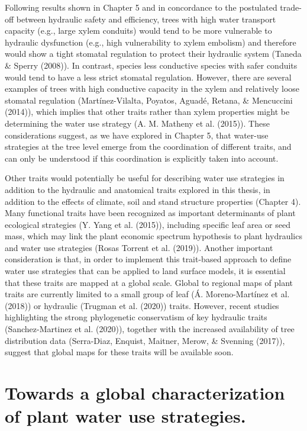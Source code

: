 \documentclass[11pt,twoside]{reedthesis}
\begin{document}
Following results shown in Chapter 5 and in concordance to the
postulated trade-off between hydraulic safety and efficiency, trees with
high water transport capacity (e.g., large xylem conduits) would tend to
be more vulnerable to hydraulic dysfunction (e.g., high vulnerability to
xylem embolism) and therefore would show a tight stomatal regulation to
protect their hydraulic system (Taneda \& Sperry (2008)). In contrast,
species less conductive species with safer conduits would tend to have a
less strict stomatal regulation. However, there are several examples of
trees with high conductive capacity in the xylem and relatively loose
stomatal regulation (Martínez-Vilalta, Poyatos, Aguadé, Retana, \&
Mencuccini (2014)), which implies that other traits rather than xylem
properties might be determining the water use strategy (A. M. Matheny et
al. (2015)). These considerations suggest, as we have explored in
Chapter 5, that water-use strategies at the tree level emerge from the
coordination of different traits, and can only be understood if this
coordination is explicitly taken into account.\par

Other traits would potentially be useful for describing water use
strategies in addition to the hydraulic and anatomical traits explored
in this thesis, in addition to the effects of climate, soil and stand
structure properties (Chapter 4). Many functional traits have been
recognized as important determinants of plant ecological strategies (Y.
Yang et al. (2015)), including specific leaf area or seed mass, which
may link the plant economic spectrum hypothesis to plant hydraulics and
water use strategies (Rosas Torrent et al. (2019)). Another important
consideration is that, in order to implement this trait-based approach
to define water use strategies that can be applied to land surface
models, it is essential that these traits are mapped at a global scale.
Global to regional maps of plant traits are currently limited to a small
group of leaf (Á. Moreno-Martínez et al. (2018)) or hydraulic (Trugman
et al. (2020)) traits. However, recent studies highlighting the strong
phylogenetic conservatism of key hydraulic traits (Sanchez-Martinez et
al. (2020)), together with the increased availability of tree
distribution data (Serra-Diaz, Enquist, Maitner, Merow, \& Svenning
(2017)), suggest that global maps for these traits will be available
soon.\par

\section{Towards a global characterization of plant water use
strategies.}\label{towards-a-global-characterization-of-plant-water-use-strategies.}
\end{document}
